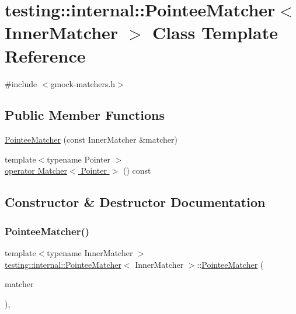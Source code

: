\hypertarget{classtesting_1_1internal_1_1_pointee_matcher}{}\section{testing\+:\+:internal\+:\+:Pointee\+Matcher$<$ Inner\+Matcher $>$ Class Template Reference}
\label{classtesting_1_1internal_1_1_pointee_matcher}


{\ttfamily \#include $<$gmock-\/matchers.\+h$>$}

\subsection*{Public Member Functions}
\begin{DoxyCompactItemize}
\item 
\hyperlink{classtesting_1_1internal_1_1_pointee_matcher_ad9f7d9dbd115c50811ce82ba27f1ba56}{Pointee\+Matcher} (const Inner\+Matcher \&matcher)
\item 
{\footnotesize template$<$typename Pointer $>$ }\\\hyperlink{classtesting_1_1internal_1_1_pointee_matcher_adec012cd8d3fa166ee89236545a57772}{operator Matcher$<$ Pointer $>$} () const
\end{DoxyCompactItemize}


\subsection{Constructor \& Destructor Documentation}
\mbox{\label{classtesting_1_1internal_1_1_pointee_matcher_ad9f7d9dbd115c50811ce82ba27f1ba56}} 
\subsubsection{\texorpdfstring{Pointee\+Matcher()}{PointeeMatcher()}}
{\footnotesize\ttfamily template$<$typename Inner\+Matcher $>$ \\
\hyperlink{classtesting_1_1internal_1_1_pointee_matcher}{testing\+::internal\+::\+Pointee\+Matcher}$<$ Inner\+Matcher $>$\+::\hyperlink{classtesting_1_1internal_1_1_pointee_matcher}{Pointee\+Matcher} (\begin{DoxyParamCaption}\item[{const Inner\+Matcher \&}]{matcher }\end{DoxyParamCaption})\hspace{0.3cm}{\ttfamily [inline]}, {\ttfamily [explicit]}}




